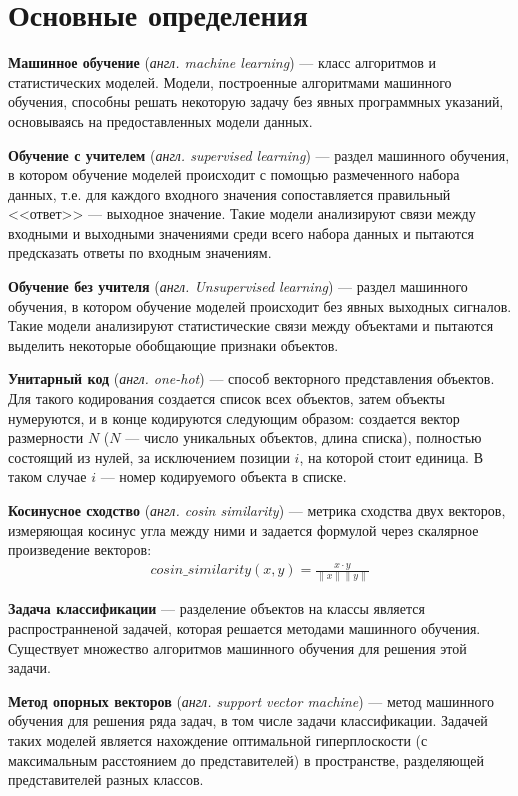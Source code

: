 \documentclass[times,specification,annotation]{itmo-student-thesis}
\begin{document}
\section{Основные определения}\label{sec:def}

\textbf{Машинное обучение} (\textit{англ. machine learning}) --- класс алгоритмов и статистических моделей. Модели, построенные алгоритмами машинного обучения, способны решать некоторую задачу без явных программных указаний, основываясь на предоставленных модели данных.   

\textbf{Обучение с учителем} (\textit{англ. supervised learning}) --- раздел машинного обучения, в котором обучение моделей происходит с помощью размеченного набора данных, т.е. для каждого входного значения сопоставляется правильный <<ответ>> --- выходное значение. Такие модели анализируют связи между входными и выходными значениями среди всего набора данных и пытаются предсказать ответы по входным значениям. 

\textbf{Обучение без учителя} (\textit{англ. Unsupervised learning}) --- раздел машинного обучения, в котором обучение моделей происходит без явных выходных сигналов. Такие модели анализируют статистические связи между объектами и пытаются выделить некоторые обобщающие признаки объектов.

\textbf{Унитарный код} (\textit{англ. one-hot}) --- способ векторного представления объектов. Для такого кодирования создается список всех объектов, затем объекты нумеруются, и в конце кодируются следующим образом: создается вектор размерности $N$ ($N$ --- число уникальных объектов, длина списка), полностью состоящий из нулей, за исключением позиции $i$, на которой стоит единица. В таком случае $i$ --- номер кодируемого объекта в списке. 

\textbf{Косинусное сходство} (\textit{англ. cosin similarity}) --- метрика сходства двух векторов, измеряющая косинус угла между ними и задается формулой через скалярное произведение векторов:
 \begin{align*}
 cosin\_similarity(x, y) = \frac{x \cdot y}{\lVert x \rVert \lVert y \rVert} 
 \end{align*}
 
\textbf{Задача классификации} --- разделение объектов на классы является распространненой задачей, которая решается методами машинного обучения. Существует множество алгоритмов машинного обучения для решения этой задачи.

\textbf{Метод опорных векторов} \cite{cortest1995} (\textit{англ. support vector machine})  --- метод машинного обучения для решения ряда задач, в том числе задачи классификации. Задачей таких моделей является нахождение оптимальной гиперплоскости (с максимальным расстоянием до представителей) в пространстве, разделяющей представителей разных классов. 
\end{document}
